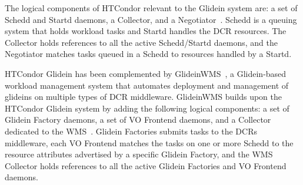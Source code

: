 \documentclass{sig-alternate}
\begin{document}
  


The logical components of HTCondor relevant to the Glidein system are: a set of Schedd and
Startd daemons, a Collector, and a Negotiator~\cite{glidein_presentation_url}.
Schedd is a queuing system that holds workload tasks and Startd handles the DCR
resources. The Collector holds references to all the active Schedd/Startd
daemons, and the Negotiator matches tasks queued in a Schedd to resources
handled by a Startd.

HTCondor Glidein has been complemented by
GlideinWMS~\cite{sfiligoi2008glideinwms}, a Glidein-based workload management
system that automates deployment and management of glideins on multiple types of
DCR middleware. GlideinWMS builds upon the HTCondor Glidein system by adding the
following logical components: a set of Glidein Factory daemons, a set of VO Frontend
daemons, and a Collector dedicated to the
WMS~\cite{glideinwms_url,glideinwms_manual_url}. Glidein Factories submits tasks
to the DCRs middleware, each VO Frontend matches the tasks on one or more Schedd
to the resource attributes advertised by a specific Glidein Factory, and the WMS
Collector holds references to all the active Glidein Factories and VO Frontend
daemons.

\end{document}
